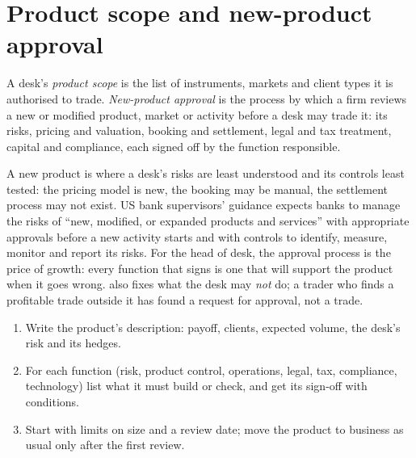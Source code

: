 \section{Product scope and new-product approval}

\begin{definition}\label{def:fm:the-head-of-desks-job:scope}
A desk's \emph{product scope} is the list of instruments, markets and client types it is authorised to trade. \emph{New-product
approval} is the process by which a firm reviews a new or modified product, market or activity before a desk may
trade it: its risks, pricing and valuation, booking and settlement, legal and tax treatment, capital and compliance, each signed off by the
function responsible.
\end{definition}

A new product is where a desk's risks are least understood and its controls least tested: the pricing model is new, the booking may be manual, the
settlement process may not exist. US bank supervisors' guidance expects banks to manage the risks of ``new, modified, or expanded products and
services'' with appropriate approvals before a new activity starts and with controls to identify, measure, monitor and report its risks. For the
head of desk, the approval process is the price of growth: every function that signs is one that will support the product when it goes wrong.
 also fixes what the desk may \emph{not} do; a trader who finds a profitable trade outside it has found a request for approval, not
a trade.

\begin{method}\label{met:fm:the-head-of-desks-job:npa}
\begin{enumerate}
\item Write the product's description: payoff, clients, expected volume, the desk's risk and its hedges.
\item For each function (risk, product control, operations, legal, tax, compliance, technology) list what it must build or check, and get its
sign-off with conditions.
\item Start with limits on size and a review date; move the product to business as usual only after the first review.
\end{enumerate}
\end{method}

